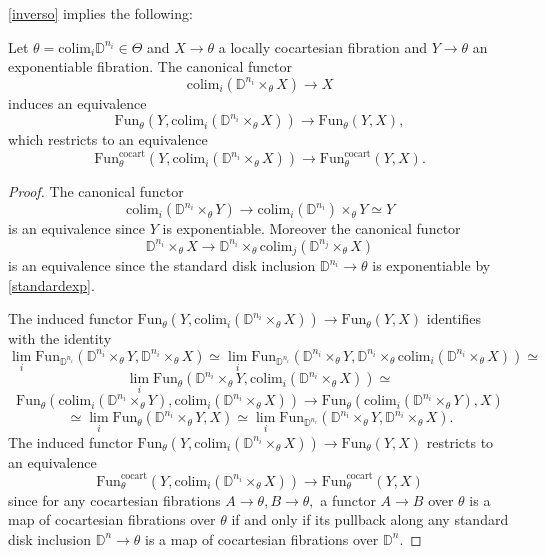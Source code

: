 \documentclass[10pt,oneside]{article}
\numberwithin{equation}{section} %
\numberwithin{figure}{section} %
\theoremstyle{plain}
\theoremstyle{definition}
\newcommand{\bD}{{\mathbb D}}
\newcommand{\colim}{\mathrm{colim}}
\newcommand{\Fun}{\mathrm{Fun}}
\newcommand{\cocart}{{\mathrm{cocart}}}
\begin{document}
\cref{inverso} implies the following:

\begin{proposition}

Let $\theta = \colim_{i} \bD^{n_i} \in \Theta$ and $X \to \theta$ a locally cocartesian fibration and $Y \to \theta$ an exponentiable fibration. The canonical functor $$ \colim_{i} (\bD^{n_i} \times_{\theta} X) \to X $$
induces an equivalence $$\Fun_{\theta}(Y,\colim_{i} (\bD^{n_i} \times_{\theta} X)) \to \Fun_{\theta}(Y,X),$$
which restricts to an equivalence $$ \Fun^\cocart_{\theta}(Y,\colim_{i} (\bD^{n_i} \times_{\theta} X)) \to \Fun^\cocart_{\theta}(Y,X). $$

\end{proposition}

\begin{proof}
The canonical functor $$ \colim_{i} (\bD^{n_i} \times_{\theta} Y) \to \colim_{i} (\bD^{n_i}) \times_{\theta} Y \simeq Y $$
is an equivalence since $Y$ is exponentiable.
Moreover the canonical functor $$ \bD^{n_i} \times_{\theta} X \to \bD^{n_i} \times_{\theta} \colim_{j} (\bD^{n_j} \times_{\theta} X) $$
is an equivalence since the standard disk inclusion $\bD^{n_i} \to \theta$ is exponentiable by \cref{standardexp}.

The induced functor $\Fun_{\theta}(Y,\colim_{i} (\bD^{n_i} \times_{\theta} X)) \to \Fun_{\theta}(Y,X)$ identifies with the identity
$$\lim_{i} \Fun_{\bD^{n_i}}(\bD^{n_i} \times_{\theta} Y,\bD^{n_i} \times_{\theta} X) \simeq \lim_{i} \Fun_{\bD^{n_i}}(\bD^{n_i} \times_{\theta} Y,\bD^{n_i} \times_{\theta} \colim_{i} (\bD^{n_i} \times_{\theta} X)) \simeq $$$$ \lim_{i} \Fun_{\theta}(\bD^{n_i} \times_{\theta} Y,\colim_{i} (\bD^{n_i} \times_{\theta} X)) \simeq $$$$ \Fun_{\theta}(\colim_{i} (\bD^{n_i} \times_{\theta} Y),\colim_{i} (\bD^{n_i} \times_{\theta} X)) \to \Fun_{\theta}(\colim_{i} (\bD^{n_i} \times_{\theta} Y),X) $$$$\simeq \lim_{i} \Fun_{\theta}(\bD^{n_i} \times_{\theta} Y,X) \simeq \lim_{i} \Fun_{\bD^{n_i}}(\bD^{n_i} \times_{\theta} Y,\bD^{n_i} \times_{\theta} X). $$
The induced functor $\Fun_{\theta}(Y,\colim_{i} (\bD^{n_i} \times_{\theta} X)) \to \Fun_{\theta}(Y,X)$
restricts to an equivalence $$ \Fun^\cocart_{\theta}(Y,\colim_{i} (\bD^{n_i} \times_{\theta} X)) \to \Fun^\cocart_{\theta}(Y,X)$$ since for any cocartesian fibrations $A \to \theta, B \to \theta,$ a functor $A \to B$ over $\theta$ is a map of cocartesian fibrations over $\theta$ if and only if its pullback along any standard disk inclusion
$\bD^n \to \theta$ is a map of cocartesian fibrations over $\bD^n.$
\end{proof}
\end{document}
